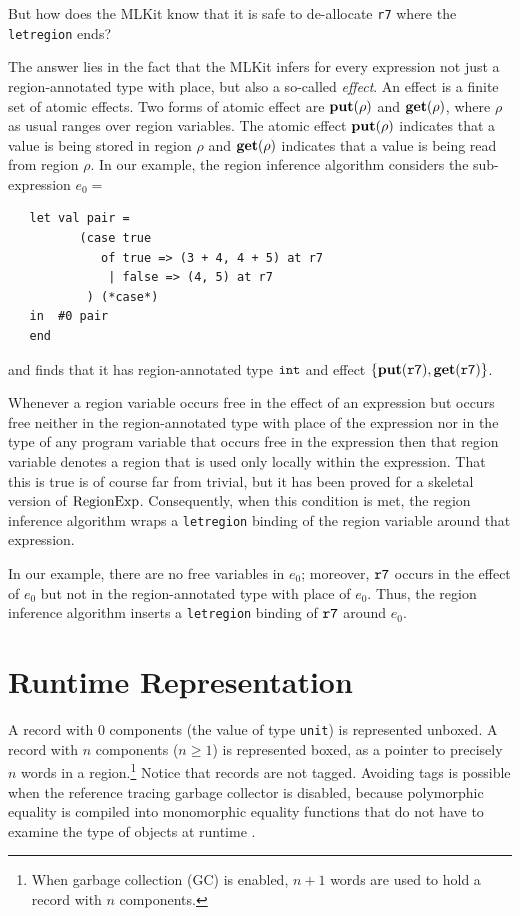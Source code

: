 \documentclass[12pt]{book}
\begin{document}
But how does the MLKit know that it is safe to 
%
de-allocate {\tt r7} where the
%
{\tt letregion} ends?

The answer lies in the fact that the MLKit infers for every expression
not just a region-annotated type with place, but also a so-called 
%
{\em effect}.  An effect is a finite set of 
%
atomic effects. Two forms of atomic effect are
%
$\mathop{\bf put}\nolimits(\rho)$ and 
%
$\mathop{\bf get}\nolimits(\rho)$, where $\rho$ as usual ranges over region variables. The
atomic effect $\mathop{\bf put}\nolimits(\rho)$ indicates that a value is being stored in
region $\rho$ and $\mathop{\bf get}\nolimits(\rho)$ indicates that a value is being read
from region $\rho$.  In our example, the region inference algorithm
considers the sub-expression $e_0 = $
\begin{verbatim}
   let val pair = 
          (case true 
             of true => (3 + 4, 4 + 5) at r7 
              | false => (4, 5) at r7
           ) (*case*) 
   in  #0 pair
   end  
\end{verbatim}
and finds that it has region-annotated type $\hbox{\tt int}$ and effect
$\{\mathop{\bf put}\nolimits(\hbox{\tt r7}), \mathop{\bf get}\nolimits(\hbox{\tt r7})\}$.

Whenever a region variable occurs free in the effect of an expression
but occurs free neither in the region-annotated type with place of the
expression nor in the type of any program variable that occurs free in
the expression then that region variable denotes a region that is used
only locally within the expression.  That this is true is of course
far from trivial, but it has been proved for a skeletal version of
$\hbox{\rm RegionExp}$.  Consequently, when this condition is met, the region
inference algorithm wraps a 
%
{\tt letregion} binding of the region variable around that expression.

In our example, there are no free variables in $e_0$; moreover,
$\hbox{\tt r7}$ occurs in the effect of $e_0$ but not in the
region-annotated type with place of $e_0$. Thus, the region inference
algorithm inserts a {\tt letregion} binding of $\hbox{\tt r7}$ around
$e_0$.

\section{Runtime Representation}
A 
%
record with 0 components (the value of type
%
{\tt unit}) is represented unboxed.  A record with $n$ components
($n\geq 1$) is represented boxed, as a pointer to precisely $n$ words
in a region.\footnote{When garbage collection (GC) is enabled, $n+1$
  words are used to hold a record with $n$ components.}  Notice that
records are not tagged. Avoiding tags is possible when the reference
tracing garbage collector is disabled, because
%
polymorphic equality is compiled into
%
monomorphic equality functions that do not have to examine the type of
objects at runtime \cite{ElsmanTIC98}.
\end{document}
